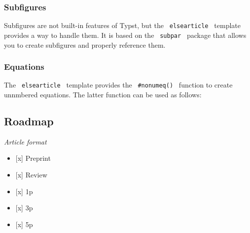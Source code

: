\subsubsection{Subfigures}\label{subfigures}

Subfigures are not built-in features of Typst, but the
\texttt{\ elsearticle\ } template provides a way to handle them. It is
based on the \texttt{\ subpar\ } package that allows you to create
subfigures and properly reference them.

\begin{Shaded}
\begin{Highlighting}[]
\NormalTok{  )}
\end{Highlighting}
\end{Shaded}

\subsubsection{Equations}\label{equations}

The \texttt{\ elsearticle\ } template provides the
\texttt{\ \#nonumeq()\ } function to create unnmbered equations. The
latter function can be used as follows:

\begin{Shaded}
\begin{Highlighting}[]
\NormalTok{\#nonumeq[$}
\NormalTok{  $}
\NormalTok{]}
\end{Highlighting}
\end{Shaded}

\subsection{Roadmap}\label{roadmap}

\emph{Article format}

\begin{itemize}
\tightlist
\item
  {[}x{]} Preprint
\item
  {[}x{]} Review
\item
  {[}x{]} 1p
\item
  {[}x{]} 3p
\item
  {[}x{]} 5p
\end{itemize}

